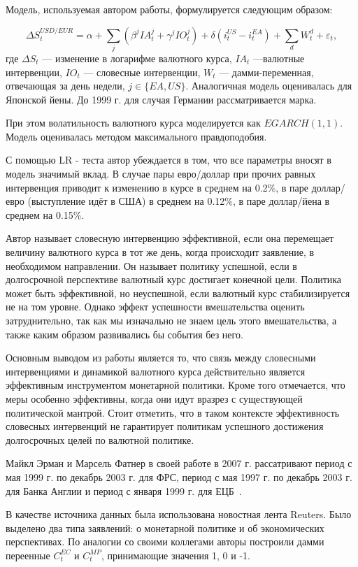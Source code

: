 \documentclass[14pt,a4paper, oneside]{extreport}
\def \a{\alpha}
\def \dt{\delta}
\newcommand{\e}{\varepsilon}
\def \Dt{\Delta}
\theoremstyle{plain}              %
\theoremstyle{definition}         %
\begin{document}
Модель, используемая автором работы, формулируется следующим образом:

\begin{equation}
\Dt S_t^{USD/EUR} = \a + \sum_j (\beta^j IA_t^j + \gamma^j IO_t^j) + \dt(i^{US}_t - i^{EA}_t) + \sum_d W_t^d + \e_t,
\end{equation} где $\Dt S_t$ --- изменение в логарифме валютного курса,  $IA_t$ ---валютные интервенции, $IO_t$ --- словесные интервенции,  $W_t$ --- дамми-переменная, отвечающая за день недели, $j \in \{EA, US\}$. Аналогичная модель оценивалась для Японской йены. До 1999 г. для случая Германии рассматривается марка.

При этом волатильность валютного курса моделируется как $EGARCH(1,1)$. Модель оценивалась методом максимального правдоподобия.

С помощью LR - теста автор убеждается в том, что все параметры вносят в модель значимый вклад.  В случае пары евро/доллар при прочих равных интервенция приводит к изменению в курсе в среднем на 0.2\%, в паре доллар/евро (выступление идёт в США) в среднем на 0.12\%, в паре доллар/йена в среднем на 0.15\%.

Автор называет словесную интервенцию эффективной, если она перемещает величину валютного курса в тот же день, когда происходит заявление, в необходимом направлении. Он называет политику успешной, если  в долгосрочной перспективе валютный курс достигает конечной цели.  Политика может быть эффективной, но неуспешной, если валютный курс стабилизируется не на том уровне. Однако эффект успешности вмешательства оценить затруднительно, так как мы изначально не знаем цель этого вмешательства, а также каким образом развивались бы события без него. 

Основным выводом из работы является то, что связь между словесными интервенциями и динамикой валютного курса действительно является эффективным инструментом монетарной политики. Кроме того отмечается, что меры особенно эффективны, когда они идут вразрез с существующей политической мантрой. Стоит отметить, что в таком контексте эффективность словесных интервенций не гарантирует политикам успешного достижения долгосрочных целей по валютной политике. 

Майкл Эрман и Марсель Фатнер в своей работе в 2007 г. рассатривают период с мая 1999 г. по декабрь 2003 г. для ФРС, период с мая 1997 г. по декабрь 2003 г. для Банка Англии и период с января 1999 г. для ЕЦБ~\cite{ehrmann2007communication}.

В качестве источника данных была использована новостная лента Reuters. Было выделено два типа заявлений: о монетарной политике и об экономических перспективах. По аналогии со своими коллегами авторы построили дамми переенные $C_t^{EC}$ и $C_t^{MP}$, принимающие значения 1, 0 и -1. 
\end{document}

